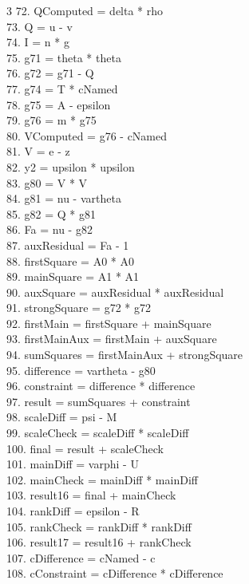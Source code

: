 \documentclass[10pt]{article}
\begin{document}
\begin{multicols}{3}
72. QComputed = delta * rho\\
73. Q = u - v\\
74. I = n * g\\
75. g71 = theta * theta\\
76. g72 = g71 - Q\\
77. g74 = T * cNamed\\
78. g75 = A - epsilon\\
79. g76 = m * g75\\
80. VComputed = g76 - cNamed\\
81. V = e - z\\
82. y2 = upsilon * upsilon\\
83. g80 = V * V\\
84. g81 = nu - vartheta\\
85. g82 = Q * g81\\
86. Fa = nu - g82\\
87. auxResidual = Fa - 1\\
88. firstSquare = A0 * A0\\
89. mainSquare = A1 * A1\\
90. auxSquare = auxResidual * auxResidual\\
91. strongSquare = g72 * g72\\
92. firstMain = firstSquare + mainSquare\\
93. firstMainAux = firstMain + auxSquare\\
94. sumSquares = firstMainAux + strongSquare\\
95. difference = vartheta - g80\\
96. constraint = difference * difference\\
97. result = sumSquares + constraint\\
98. scaleDiff = psi - M\\
99. scaleCheck = scaleDiff * scaleDiff\\
100. final = result + scaleCheck\\
101. mainDiff = varphi - U\\
102. mainCheck = mainDiff * mainDiff\\
103. result16 = final + mainCheck\\
104. rankDiff = epsilon - R\\
105. rankCheck = rankDiff * rankDiff\\
106. result17 = result16 + rankCheck\\
107. cDifference = cNamed - c\\
108. cConstraint = cDifference * cDifference\\

\end{multicols}
\end{document}
